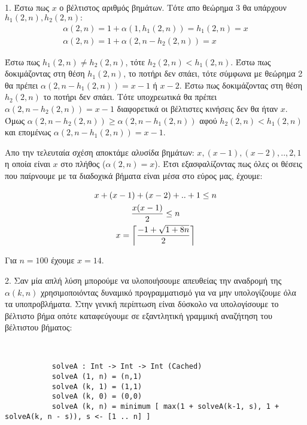 \begin{center}
\newpage

    1. Έστω πως $x$ ο βέλτιστος αριθμός βημάτων. Tότε απο θεώρημα 3 θα υπάρχουν $h_1(2,n), h_2(2,n):$
    $$
    \begin{gathered}
        \alpha(2,n) = 1 + \alpha(1, h_1(2,n)) = h_1(2,n) = x \\
        \alpha(2,n) = 1 + \alpha(2, n-h_2(2,n)) = x
    \end{gathered}
    $$

    Έστω πως $h_1(2,n) \neq h_2(2,n)$, τότε $h_2(2,n) < h_1(2,n)$. Έστω πως δοκιμάζοντας στη θέση $h_1(2,n)$, το ποτήρι δεν σπάει, τότε σύμφωνα με θεώρημα 2 θα πρέπει
    $\alpha(2,n-h_1(2,n)) = x-1$ ή $x-2$. Έστω πως δοκιμάζοντας στη θέση $h_2(2,n)$ το ποτήρι δεν σπάει. Τότε υποχρεωτικά θα πρέπει $\alpha(2,n-h_2(2,n)) = x-1$ διαφορετικά
    οι βέλτιστες κινήσεις δεν θα ήταν $x$. Όμως $\alpha(2,n-h_2(2,n)) \ge \alpha(2,n-h_1(2,n))$ αφού $h_2(2,n) < h_1(2,n)$ και επομένως $\alpha(2,n-h_1(2,n)) = x-1$.

    Απο την τελευταία σχέση αποκτάμε αλυσίδα βημάτων: $x, (x-1), (x-2), .., 2, 1$ η οποία είναι $x$ στο πλήθος ($\alpha(2,n) = x$).
    Έτσι εξασφαλίζοντας πως όλες οι θέσεις που παίρνουμε με τα διαδοχικά βήματα είναι μέσα στο εύρος μας, έχουμε:

    $$
    \begin{gathered}
        x + (x-1) + (x-2) + .. + 1 \le n \\
        \frac{x(x-1)}{2} \le n \\
        x = \ceil*{\frac{-1 + \sqrt{1+8n}}{2}}
    \end{gathered}
    $$

    Για $n=100$ έχουμε $x = 14$.

\end{center}

    2. Σαν μία απλή λύση μπορούμε να υλοποιήσουμε απευθείας την αναδρομή της $\alpha(k,n)$ χρησιμοποιόντας δυναμικό προγραμματισμό για να μην υπολογίζουμε όλα τα υποπροβλήματα.
       Στην γενική περίπτωση είναι δύσκολο να υπολογίσουμε το βέλτιστο βήμα οπότε καταφεύγουμε σε εξαντλητική γραμμική αναζήτηση του βέλτιστου βήματος:

       \begin{verbatim}


           solveA : Int -> Int -> Int (Cached)
           solveA (1, n) = (n,1)
           solveA (k, 1) = (1,1)
           solveA (k, 0) = (0,0)
           solveA (k, n) = minimum [ max(1 + solveA(k-1, s), 1 + solveA(k, n - s)), s <- [1 .. n] ]

       \end{verbatim}

